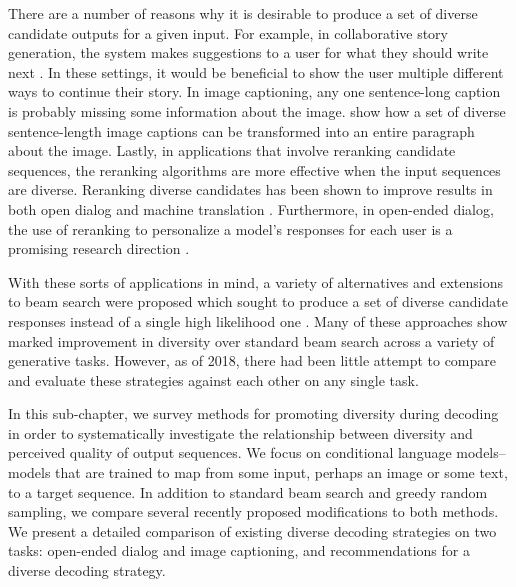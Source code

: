 There are a number of reasons why it is desirable to produce a set of diverse candidate outputs for a given input.
For example, in collaborative story generation, the system makes suggestions to a user for what they should write next \cite{clark2018creative}.
In these settings, it would be beneficial to show the user multiple different ways to continue their story.
In image captioning, any one sentence-long caption is probably missing some information about the image.
\citet{krause2017hierarchical} show how a set of diverse sentence-length image captions can be transformed into an entire paragraph about the image.
Lastly, in applications that involve reranking candidate sequences, the reranking algorithms are more effective when the input sequences are diverse.
Reranking diverse candidates has been shown to improve results in both open dialog and machine translation \cite{li2016diversity,li2016mutual,gimpel2013systematic}. 
Furthermore, in open-ended dialog, the use of reranking to personalize a model's responses for each user is a promising research direction \cite{Choudhary2017DomainAN}.

With these sorts of applications in mind, a variety of alternatives and extensions to beam search were proposed which sought to produce a set of diverse candidate responses instead of a single high likelihood one \cite{li2016diversity,vijayakumar2016diverse,kulikov2018importance,tam2019clustered}.
Many of these approaches show marked improvement in diversity over standard beam search across a variety of generative tasks.
However, as of 2018, there had been little attempt to compare and evaluate these strategies against each other on any single task.

In this sub-chapter, we survey methods for promoting diversity during decoding in order to systematically investigate the relationship between diversity and perceived quality of output sequences.
We focus on conditional language models--models that are trained to map from some input, perhaps an image or some text, to a target sequence.
In addition to standard beam search and greedy random sampling, we compare several recently proposed modifications to both methods.
We present a detailed comparison of existing diverse decoding strategies on two tasks: open-ended dialog and image captioning, and recommendations for a diverse decoding strategy.

